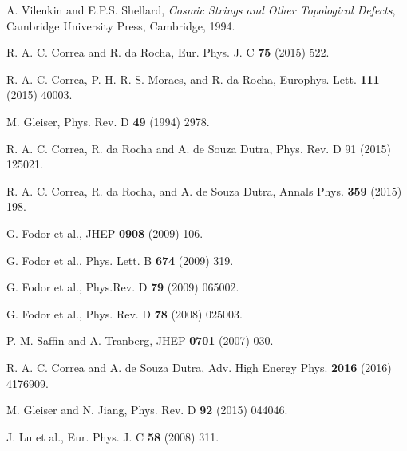 \begin{thebibliography}{99}
 A. Vilenkin and E.P.S. Shellard, \textit{Cosmic Strings and
Other Topological Defects}, Cambridge University Press, Cambridge, 1994.

 R. A. C. Correa and R. da Rocha, Eur. Phys. J. C \textbf{75}
(2015) 522.

 R. A. C. Correa, P. H. R. S. Moraes, and R. da Rocha,
Europhys. Lett. \textbf{111} (2015) 40003.

 M. Gleiser, Phys. Rev. D \textbf{49} (1994) 2978.

 R. A. C. Correa, R. da Rocha and A. de Souza Dutra, Phys. Rev. D
91 (2015) 125021.

 R. A. C. Correa, R. da Rocha, and A. de Souza Dutra, Annals
Phys. \textbf{359} (2015) 198.

 G. Fodor et al., JHEP \textbf{0908} (2009) 106.

 G. Fodor et al., Phys. Lett. B \textbf{674} (2009) 319.

 G. Fodor et al., Phys.Rev. D \textbf{79} (2009) 065002.

 G. Fodor et al., Phys. Rev. D \textbf{78} (2008) 025003.

 P. M. Saffin and A. Tranberg, JHEP \textbf{0701} (2007) 030.

 R. A. C. Correa and A. de Souza Dutra, Adv. High Energy Phys. 
\textbf{2016} (2016) 4176909.

 M. Gleiser and N. Jiang, Phys. Rev. D \textbf{92} (2015) 044046.

 J. Lu et al., Eur. Phys. J. C {\bf 58} (2008) 311.




\end{thebibliography}


